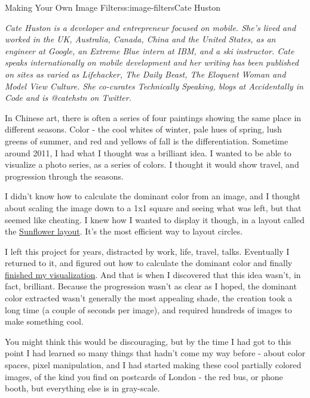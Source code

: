 \begin{aosachapter}{Making Your Own Image Filters}{s:image-filters}{Cate Huston}

\emph{Cate Huston is a developer and entrepreneur focused on mobile.
She's lived and worked in the UK, Australia, Canada, China and the
United States, as an engineer at Google, an Extreme Blue intern at IBM,
and a ski instructor. Cate speaks internationally on mobile development
and her writing has been published on sites as varied as Lifehacker, The
Daily Beast, The Eloquent Woman and Model View Culture. She co-curates
Technically Speaking, blogs at Accidentally in Code and is @catehstn on
Twitter.}

\label{a-story-of-a-brilliant-idea-that-wasnt-all-that-brilliant}

In Chinese art, there is often a series of four paintings showing the
same place in different seasons. Color - the cool whites of winter, pale
hues of spring, lush greens of summer, and red and yellows of fall is
the differentiation. Sometime around 2011, I had what I thought was a
brilliant idea. I wanted to be able to visualize a photo series, as a
series of colors. I thought it would show travel, and progression
through the seasons.

I didn't know how to calculate the dominant color from an image, and I
thought about scaling the image down to a 1x1 square and seeing what was
left, but that seemed like cheating. I knew how I wanted to display it
though, in a layout called the
\href{http://www.catehuston.com/applets/Sunflower/index.html}{Sunflower
layout}. It's the most efficient way to layout circles.

I left this project for years, distracted by work, life, travel, talks.
Eventually I returned to it, and figured out how to calculate the
dominant color and finally
\href{http://www.catehuston.com/blog/2013/09/02/visualising-a-photo-series/}{finished
my visualization}. And that is when I discovered that this idea wasn't,
in fact, brilliant. Because the progression wasn't as clear as I hoped,
the dominant color extracted wasn't generally the most appealing shade,
the creation took a long time (a couple of seconds per image), and
required hundreds of images to make something cool.

You might think this would be discouraging, but by the time I had got to
this point I had learned so many things that hadn't come my way before -
about color spaces, pixel manipulation, and I had started making these
cool partially colored images, of the kind you find on postcards of
London - the red bus, or phone booth, but everything else is in
gray-scale.


\end{aosachapter}
